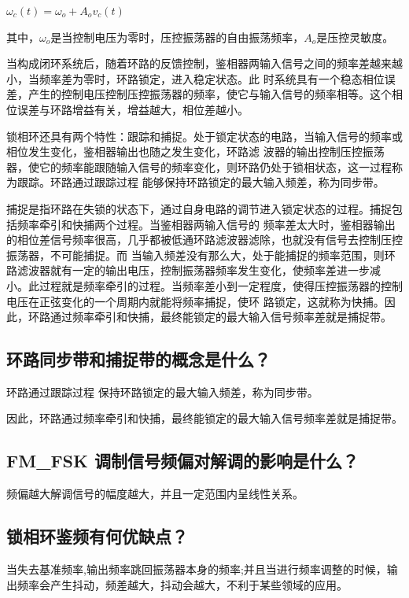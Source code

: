 \documentclass{../source/Experiment}
\begin{document}
$\omega_c(t) = \omega_o + A_o v_c(t)$

其中，$\omega_o$是当控制电压为零时，压控振荡器的自由振荡频率，$A_o$是压控灵敏度。

当构成闭环系统后，随着环路的反馈控制，鉴相器两输入信号之间的频率差越来越小，当频率差为零时，环路锁定，进入稳定状态。此
时系统具有一个稳态相位误差，产生的控制电压控制压控振荡器的频率，使它与输入信号的频率相等。这个相位误差与环路增益有关，增益越大，相位差越小。

锁相环还具有两个特性：跟踪和捕捉。处于锁定状态的电路，当输入信号的频率或相位发生变化，鉴相器输出也随之发生变化，环路滤
波器的输出控制压控振荡器，使它的频率能跟随输入信号的频率变化，则环路仍处于锁相状态，这一过程称为跟踪。环路通过跟踪过程
能够保持环路锁定的最大输入频差，称为同步带。

捕捉是指环路在失锁的状态下，通过自身电路的调节进入锁定状态的过程。捕捉包括频率牵引和快捕两个过程。当鉴相器两输入信号的
频率差太大时，鉴相器输出的相位差信号频率很高，几乎都被低通环路滤波器滤除，也就没有信号去控制压控振荡器，不可能捕捉。而
当输入频差没有那么大，处于能捕捉的频率范围，则环路滤波器就有一定的输出电压，控制振荡器频率发生变化，使频率差进一步减
小。此过程就是频率牵引的过程。当频率差小到一定程度，使得压控振荡器的控制电压在正弦变化的一个周期内就能将频率捕捉，使环
路锁定，这就称为快捕。因此，环路通过频率牵引和快捕，最终能锁定的最大输入信号频率差就是捕捉带。

\subsection{环路同步带和捕捉带的概念是什么？}
环路通过跟踪过程
保持环路锁定的最大输入频差，称为同步带。

因此，环路通过频率牵引和快捕，最终能锁定的最大输入信号频率差就是捕捉带。
\subsection{FM\_FSK 调制信号频偏对解调的影响是什么？}
频偏越大解调信号的幅度越大，并且一定范围内呈线性关系。
\subsection{锁相环鉴频有何优缺点？}
当失去基准频率,输出频率跳回振荡器本身的频率;并且当进行频率调整的时候，输出频率会产生抖动，频差越大，抖动会越大，不利于某些领域的应用。
\end{document}
